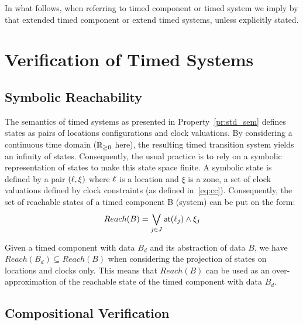 In what follows, when referring to timed component or timed system we imply by that 
extended timed component or extend timed systems, unless explicitly stated. 

\section{Verification of Timed Systems}\label{sec:2.4}
\subsection{Symbolic Reachability}

The semantics of timed systems as presented in Property~\ref{pr:std_sem} 
defines states as pairs of locations configurations and clock
valuations. By considering a continuous time domain ($\mathbb{R}_{\ge 0}$ here), the 
resulting timed transition system yields an infinity of states.
Consequently, the usual practice is to rely on a symbolic representation
of states to make this state space finite.
A symbolic state is defined by a pair $(\ell,\xi)$ where $\ell$ is a location
and $\xi$ is a zone, a set of clock valuations defined by clock constraints
(as defined in~\ref{eq:cc}). Consequently, the set of reachable states of a 
timed component B (system) can be put on the form:
\begin{displaymath}
  Reach(B)=\bigvee_{j\in{J}}\textsf{at}(\ell_j)\wedge\xi_j
\end{displaymath}

Given a timed component with data $B_d$ and its abstraction of data $B$, we have
$Reach(B_d)\subseteq Reach(B)$ when considering the projection of states on locations and clocks 
only. This means that $Reach(B)$ can be used as an over-approximation
of the reachable state of the timed component with data $B_d$.
\subsection{Compositional Verification}

